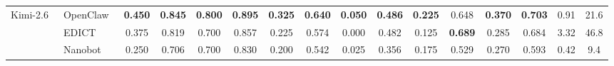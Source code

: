 \begin{table}[t]
{\begin{tabular}{ll cc cc cc cc cc cccc}
  \midrule

  \multirow{3}{*}{Kimi-2.6~\cite{kimi26}}
  & OpenClaw~\cite{openclaw} & \textbf{0.450} & \textbf{0.845} & \textbf{0.800} & \textbf{0.895} & \textbf{0.325} & \textbf{0.640} & \textbf{0.050} & \textbf{0.486} & \textbf{0.225} & 0.648 & \textbf{0.370} & \textbf{0.703} & 0.91 & 21.6 \\
  & EDICT~\cite{edict}    & 0.375 & 0.819 & 0.700 & 0.857 & 0.225 & 0.574 & 0.000 & 0.482 & 0.125 & \textbf{0.689} & 0.285 & 0.684 & 3.32 & 46.8 \\
  & Nanobot~\cite{nanobot}  & 0.250 & 0.706 & 0.700 & 0.830 & 0.200 & 0.542 & 0.025 & 0.356 & 0.175 & 0.529 & 0.270 & 0.593 & 0.42 & 9.4 \\

  \bottomrule
  \end{tabular} }
  \end{table}
\vspace{-8pt}
